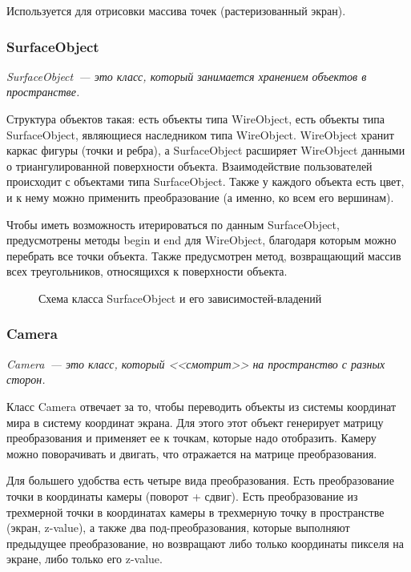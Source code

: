 \documentclass{article}
\begin{document}
Используется для отрисовки массива точек (растеризованный экран).

\subsubsection{SurfaceObject}

\textit{SurfaceObject~--- это класс, который занимается хранением объектов в пространстве.}
\medskip

Структура объектов такая: есть объекты типа WireObject, есть объекты типа SurfaceObject, являющиеся наследником типа WireObject. WireObject хранит каркас фигуры (точки и ребра), а SurfaceObject расширяет WireObject данными о триангулированной поверхности объекта. Взаимодействие пользователей происходит с объектами типа SurfaceObject. Также у каждого объекта есть цвет, и к нему можно применить преобразование (а именно, ко всем его вершинам).

Чтобы иметь возможность итерироваться по данным SurfaceObject, предусмотрены методы begin и end для WireObject, благодаря которым можно перебрать все точки объекта. Также предусмотрен метод, возвращающий массив всех треугольников, относящихся к поверхности объекта.

\begin{center}
\begin{figure}[H]
\caption{Схема класса SurfaceObject и его зависимостей-владений}
\label{ris:image}
\end{figure}
\end{center}
\newpage

\subsubsection{Camera}

\textit{Camera~--- это класс, который <<смотрит>> на пространство с разных сторон.}
\medskip

Класс Camera отвечает за то, чтобы переводить объекты из системы координат мира в систему координат экрана. Для этого этот объект генерирует матрицу преобразования и применяет ее к точкам, которые надо отобразить. Камеру можно поворачивать и двигать, что отражается на матрице преобразования.

Для большего удобства есть четыре вида преобразования. Есть преобразование точки в координаты камеры (поворот + сдвиг). Есть преобразование из трехмерной точки в координатах камеры в трехмерную точку в пространстве (экран, z-value), а также два под-преобразования, которые выполняют предыдущее преобразование, но возвращают либо только координаты пикселя на экране, либо только его z-value.
\end{document}
